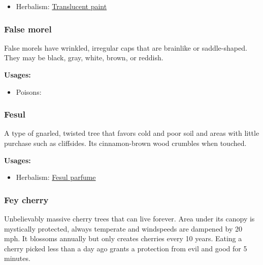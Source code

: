 \begin{itemize}[noitemsep]
\item[] Herbalism: \hyperref[Translucent paint]{Translucent paint}
\end{itemize}

\subsubsection{False morel}
\label{False morel}

False morels have wrinkled, irregular caps that are brainlike or saddle-shaped. They may be black, gray, white, brown, or reddish.

\vspace{5mm}

\textbf{Usages:}

\begin{itemize}[noitemsep]
\item[] Poisons: \poison
\end{itemize}


\subsubsection{Fesul}
\label{Fesul}

A type of gnarled, twisted tree that favors cold and poor soil and areas with little purchase such as cliffsides. Its cinnamon-brown wood crumbles when touched.

\vspace{5mm}

\textbf{Usages:}

\begin{itemize}[noitemsep]
\item[] Herbalism: \hyperref[Fesul parfume]{Fesul parfume}
\end{itemize}

\subsubsection{Fey cherry}
\label{Fey cherry}

Unbelievably massive cherry trees that can live forever. Area under its canopy is mystically protected, always temperate and windspeeds are dampened by 20 mph. It blossoms annually but only creates cherries every 10 years. Eating a cherry picked less than a day ago grants a protection from evil and good for 5 minutes.

\vspace{5mm}

